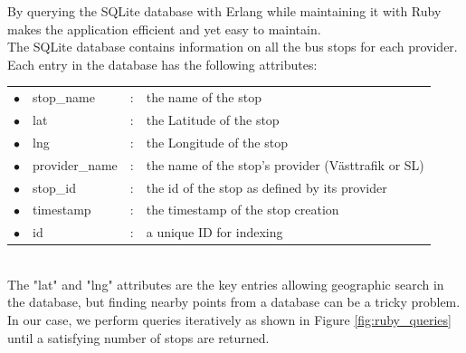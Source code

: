By querying the SQLite database with Erlang while maintaining it with Ruby makes the application efficient and yet easy to maintain.\\

The SQLite database contains information on all the bus stops for each provider. Each entry in the database has the following attributes:\\

\begin{tabular}{ l l l l }
$\bullet$ & stop\_name 	& : & the name of the stop\\
$\bullet$ & lat 			& : & the Latitude of the stop\\
$\bullet$ & lng 			& : & the Longitude of the stop\\
$\bullet$ & provider\_name & : & the name of the stop's provider (Västtrafik or SL)\\
$\bullet$ & stop\_id 		& : & the id of the stop as defined by its provider\\
$\bullet$ & timestamp 	& : & the timestamp of the stop creation\\
$\bullet$ & id		 	& : & a unique ID for indexing\\
\end{tabular}\\

\clearpage
The "lat" and "lng" attributes are the key entries allowing geographic search in the database, but finding nearby points from a database can be a tricky problem. In our case, we perform queries iteratively as shown in Figure \ref{fig:ruby_queries} until a satisfying number of stops are returned.\\

